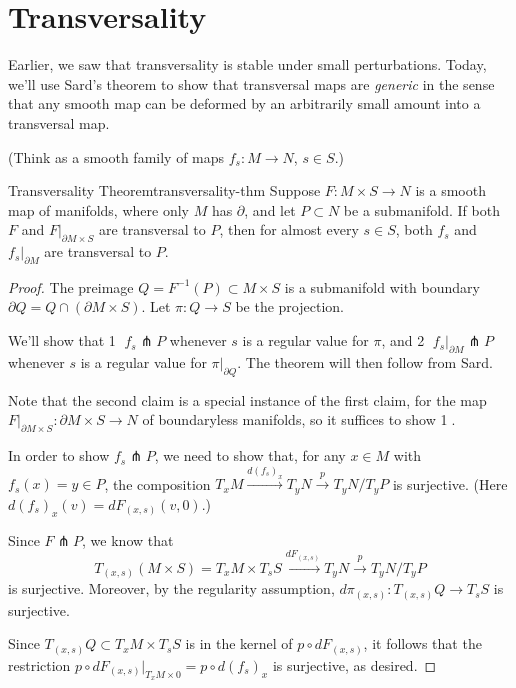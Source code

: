 
\section{Transversality}

Earlier, we saw that transversality is stable under small perturbations. Today, we'll use Sard's theorem to show that transversal maps are \emph{generic} in the sense that any smooth map can be deformed by an arbitrarily small amount into a transversal map.

(Think as a smooth family of maps $f_s \colon M \to N$, $s \in S$.)

\begin{theorem}{Transversality Theorem}{transversality-thm}
    Suppose $F \colon M \times S \to N$ is a smooth map of manifolds, where only $M$ has $\partial$, and let $P \subset N$ be a submanifold. If both $F$ and $F|_{\partial M \times S}$ are transversal to $P$, then for almost every $s \in S$, both $f_s$ and $f_s|_{\partial M}$ are transversal to $P$.
\end{theorem}

\begin{proof}
    The preimage $Q = F^{-1}(P) \subset M \times S$ is a submanifold with boundary $\partial Q = Q \cap (\partial M \times S)$. Let $\pi \colon Q \to S$ be the projection.

    We'll show that \textcircled{1} $f_s \pitchfork P$ whenever $s$ is a regular value for $\pi$, and \textcircled{2} $f_s|_{\partial M} \pitchfork P$ whenever $s$ is a regular value for $\pi|_{\partial Q}$. The theorem will then follow from Sard.

    Note that the second claim is a special instance of the first claim, for the map $F|_{\partial M \times S} \colon \partial M \times S \to N$ of boundaryless manifolds, so it suffices to show \textcircled{1}.

    In order to show $f_s \pitchfork P$, we need to show that, for any $x \in M$ with $f_s(x) = y \in P$, the composition $T_x M \xrightarrow{d(f_s)_x} T_y N \xrightarrow{p} T_y N / T_y P$ is surjective. (Here $d(f_s)_x(v) = dF_{(x,s)}(v, 0)$.)

    Since $F \pitchfork P$, we know that
    \[
        T_{(x,s)}(M \times S) = T_x M \times T_s S \xrightarrow{dF_{(x,s)}} T_y N \xrightarrow{p} T_y N / T_y P
    \]
    is surjective. Moreover, by the regularity assumption, $d\pi_{(x,s)} \colon T_{(x,s)} Q \to T_s S$ is surjective.

    Since $T_{(x,s)} Q \subset T_x M \times T_s S$ is in the kernel of $p \circ dF_{(x,s)}$, it follows that the restriction $p \circ dF_{(x,s)}|_{T_x M \times 0} = p \circ d(f_s)_x$ is surjective, as desired.
\end{proof}

